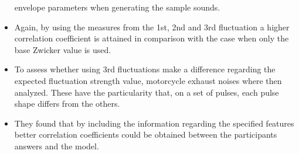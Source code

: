 \begin{itemize}
        envelope parameters when generating the sample sounds.
    \item Again, by using the measures from the 1st, 2nd and 3rd fluctuation a
        higher correlation coefficient is attained in comparison with the case
        when only the base Zwicker value is used.
    \item To assess whether using 3rd fluctuations make a difference regarding
        the expected fluctuation strength value, motorcycle exhaust noises where
        then analyzed. These have the particularity that, on a set of pulses,
        each pulse shape differs from the others. 
    \item They found that by including the information regarding the specified
        features better correlation coefficients could be obtained between the
        participants answers and the model.
\end{itemize}
